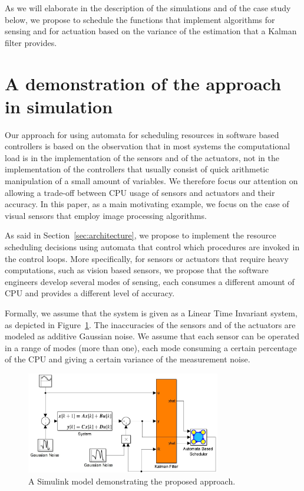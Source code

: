 \documentclass{sig-alternate-ipsn13}
\begin{document}
As we will elaborate in the description of the simulations and of the case study below, we propose to schedule the functions that implement algorithms for sensing and for actuation based on the variance of the estimation that a Kalman filter provides. 



\section{A demonstration of the approach in simulation}
\label{sec:simulation}

Our approach for using automata for scheduling resources in software based controllers is based on the observation that in most systems the computational load is in the implementation of the sensors and of the actuators, not in the implementation of the controllers that usually consist of quick arithmetic manipulation of a small amount of variables. We therefore focus our attention on allowing a trade-off between CPU usage of sensors and actuators and their accuracy. In this paper, as a main motivating example, we focus on the case of visual sensors that employ image processing algorithms.

As said in Section~\ref{sec:architecture}, we propose to implement the resource scheduling decisions using automata that control which procedures are invoked in the control loops. More specifically, for sensors or actuators that require heavy computations, such as vision based sensors, we propose that the software engineers develop several modes of sensing, each consumes a different amount of CPU and provides a different level of accuracy. 

Formally, we assume that the system is given as a Linear Time Invariant system, as depicted in Figure~\ref{fig:simulink}. The inaccuracies of the sensors and of the actuators are modeled as additive Gaussian noise. We assume that each sensor can be operated in a range of modes (more than one), each mode consuming a certain percentage of the CPU and giving a certain variance of the measurement noise.

\begin{figure}%
	\centerline{\includegraphics[width=85mm]{SimulinkModel.jpg}}
	\caption{A Simulink model demonstrating the proposed approach.}
	\label{fig:simulink}
\end{figure}
\end{document}
